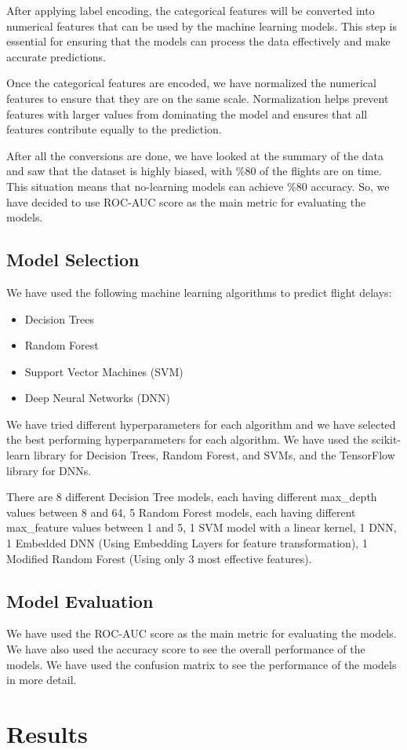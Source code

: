 \documentclass[conference]{IEEEtran}
\begin{document}
After applying label encoding, the categorical features will be converted into numerical features that can be used by the machine learning models. This step is essential for ensuring that the models can process the data effectively and make accurate predictions.

Once the categorical features are encoded, we have normalized the numerical features to ensure that they are on the same scale. Normalization helps prevent features with larger values from dominating the model and ensures that all features contribute equally to the prediction.

After all the conversions are done, we have looked at the summary of the data and saw that the dataset is highly biased, with \%80 of the flights are on time. This situation means that no-learning models can achieve \%80 accuracy. So, we have decided to use ROC-AUC score as the main metric for evaluating the models.

\subsection{Model Selection}
We have used the following machine learning algorithms to predict flight delays:

\begin{itemize}
    \item Decision Trees
    \item Random Forest
    \item Support Vector Machines (SVM)
    \item Deep Neural Networks (DNN)
\end{itemize}

We have tried different hyperparameters for each algorithm and we have selected the best performing hyperparameters for each algorithm. We have used the scikit-learn library for Decision Trees, Random Forest, and SVMs, and the TensorFlow library for DNNs.

There are 8 different Decision Tree models, each having different max\_depth values between 8 and 64,
5 Random Forest models, each having different max\_feature values between 1 and 5,
1 SVM model with a linear kernel,
1 DNN,
1 Embedded DNN (Using Embedding Layers for feature transformation),
1 Modified Random Forest (Using only 3 most effective features).

\subsection{Model Evaluation}
We have used the ROC-AUC score as the main metric for evaluating the models. We have also used the accuracy score to see the overall performance of the models. We have used the confusion matrix to see the performance of the models in more detail.

\section{Results}
\end{document}
